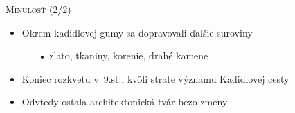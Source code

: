 \documentclass[xcolor=dvipsnames]{beamer}
\begin{document}
\begin{frame}{\textsc{Minulosť (2/2)}}
\transwipe
	\begin{itemize}
	\item Okrem kadidlovej gumy sa dopravovali ďalšie suroviny
		\begin{itemize}
		\item[•] zlato, tkaniny, korenie, drahé kamene
		\end{itemize}
	\item Koniec rozkvetu v~9.st., kvôli strate významu Kadidlovej cesty
	\item Odvtedy ostala architektonická tvár bezo zmeny
	\end{itemize}
	\bigskip
	\begin{figure}[ht]
		\begin{center}
		\end{center}
	\end{figure}
\end{frame}

\end{document}
